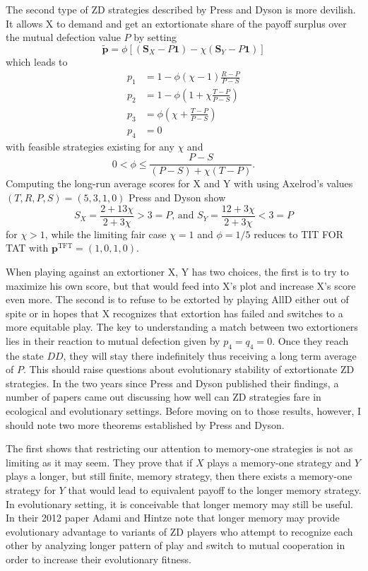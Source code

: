 The second type of ZD strategies described by Press and Dyson is more devilish. It allows X to demand and get an extortionate share of the payoff surplus over the mutual defection value $P$ by setting
\[
\tilde{\mathbf{p}} = \phi [(\mathbf{S}_X - P\mathbf{1}) - \chi (\mathbf{S}_Y - P \mathbf{1})]
\]
which leads to
\begin{align*}
p_1 &= 1 - \phi(\chi-1) \frac{R-P}{P-S} \\
p_2 &= 1 - \phi\left(1 + \chi \frac{T-P}{P-S}\right) \\
p_3 &= \phi (\chi + \frac{T-P}{P-S}) \\
p_4 &= 0
\end{align*}
with feasible strategies existing for any $\chi$ and
\[
0 < \phi \leq \frac{P-S}{(P-S) + \chi(T-P)}.
\]
Computing the long-run average scores for X and Y with using Axelrod's values $(T, R, P, S) = (5, 3, 1, 0)$ Press and Dyson show
\[
S_X = \frac{2 + 13\chi}{2 + 3\chi} > 3 = P\textrm{, and } S_Y = \frac{12 + 3\chi}{2 + 3\chi} < 3 = P
\]
for $\chi > 1$, while the limiting fair case $\chi = 1$ and $\phi = 1/5$ reduces to TIT FOR TAT with $\mathbf{p}^\textrm{TFT} = (1, 0, 1, 0)$.

When playing against an extortioner X, Y has two choices, the first is to try to maximize his own score, but that would feed into X's plot and increase X's score even more. The second is to refuse to be extorted by playing AllD either out of spite or in hopes that X recognizes that extortion has failed and switches to a more equitable play. The key to understanding a match between two extortioners lies in their reaction to mutual defection given by $p_4 = q_4 = 0$. Once they reach the state $DD$, they will stay there indefinitely thus receiving a long term average of $P$. This should raise questions about evolutionary stability of extortionate ZD strategies. In the two years since Press and Dyson published their findings, a number of papers came out discussing how well can ZD strategies fare in ecological and evolutionary settings. Before moving on to those results, however, I should note two more theorems established by Press and Dyson.

The first shows that restricting our attention to memory-one strategies is not as limiting as it may seem. They prove that if $X$ plays a memory-one strategy and $Y$ plays a longer, but still finite, memory strategy, then there exists a memory-one strategy for $Y$ that would lead to equivalent payoff to the longer memory strategy. In evolutionary setting, it is conceivable that longer memory may still be useful. In their 2012 paper Adami and Hintze \cite{Adami_Hintze_2014} note that longer memory may provide evolutionary advantage to variants of ZD players who attempt to recognize each other by analyzing longer pattern of play and switch to mutual cooperation in order to increase their evolutionary fitness.

